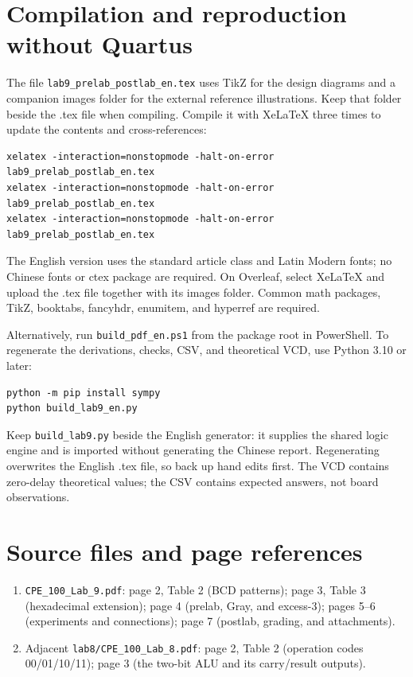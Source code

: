 \documentclass[a4paper,11pt]{article}
\begin{document}
\appendix
\clearpage\section{Compilation and reproduction without Quartus}
The file \texttt{lab9\_prelab\_postlab\_en.tex} uses TikZ for the design diagrams and a companion images folder for the external reference illustrations. Keep that folder beside the .tex file when compiling. Compile it with XeLaTeX three times to update
the contents and cross-references:
\begin{verbatim}
xelatex -interaction=nonstopmode -halt-on-error lab9_prelab_postlab_en.tex
xelatex -interaction=nonstopmode -halt-on-error lab9_prelab_postlab_en.tex
xelatex -interaction=nonstopmode -halt-on-error lab9_prelab_postlab_en.tex
\end{verbatim}
The English version uses the standard article class and Latin Modern fonts; no Chinese
fonts or ctex package are required. On Overleaf, select XeLaTeX and upload the .tex file together with its images folder.
Common math packages, TikZ, booktabs, fancyhdr, enumitem, and hyperref are required.

Alternatively, run \texttt{build\_pdf\_en.ps1} from the package root in PowerShell.
To regenerate the derivations, checks, CSV, and theoretical VCD, use Python 3.10 or later:
\begin{verbatim}
python -m pip install sympy
python build_lab9_en.py
\end{verbatim}
Keep \texttt{build\_lab9.py} beside the English generator: it supplies the shared logic
engine and is imported without generating the Chinese report. Regenerating overwrites
the English .tex file, so back up hand edits first. The VCD contains zero-delay theoretical
values; the CSV contains expected answers, not board observations.

\section{Source files and page references}
\begin{enumerate}
\item \texttt{CPE\_100\_Lab\_9.pdf}: page 2, Table 2 (BCD patterns); page 3,
Table 3 (hexadecimal extension); page 4 (prelab, Gray, and excess-3); pages 5--6
(experiments and connections); page 7 (postlab, grading, and attachments).
\item Adjacent \texttt{lab8/CPE\_100\_Lab\_8.pdf}: page 2, Table 2 (operation codes
00/01/10/11); page 3 (the two-bit ALU and its carry/result outputs).
\end{enumerate}
\end{document}
